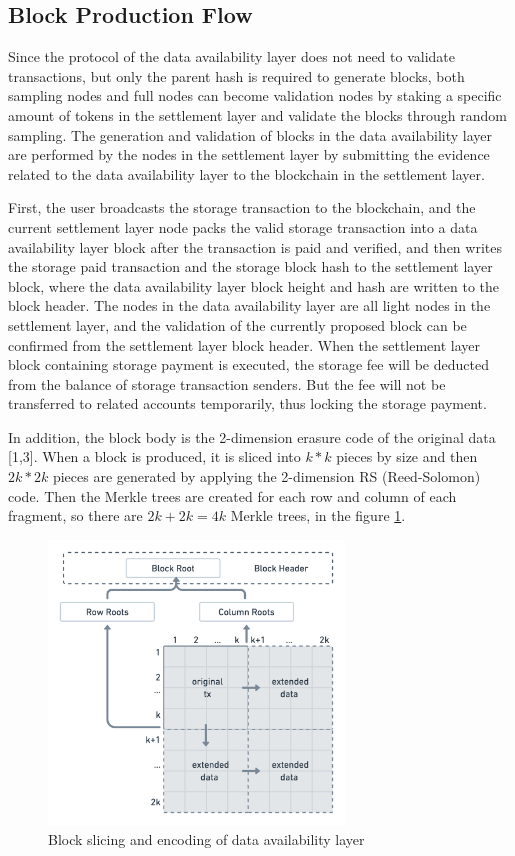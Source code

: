 \documentclass{iacrtrans}
\begin{document}
\subsection{Block Production Flow}
Since the protocol of the data availability layer does not need to validate transactions, but only the parent hash is required to generate blocks, both sampling nodes and full nodes can become validation nodes by staking a specific amount of tokens in the settlement layer and validate the blocks through random sampling. The generation and validation of blocks in the data availability layer are performed by the nodes in the settlement layer by submitting the evidence related to the data availability layer to the blockchain in the settlement layer.

First, the user broadcasts the storage transaction to the blockchain, and the current settlement layer node packs the valid storage transaction into a data availability layer block after the transaction is paid and verified, and then writes the storage paid transaction and the storage block hash to the settlement layer block, where the data availability layer block height and hash are written to the block header. The nodes in the data availability layer are all light nodes in the settlement layer, and the validation of the currently proposed block can be confirmed from the settlement layer block header. When the settlement layer block containing storage payment is executed, the storage fee will be deducted from the balance of storage transaction senders. But the fee will not be transferred to related accounts temporarily, thus locking the storage payment. 

In addition, the block body is the 2-dimension erasure code of the original data [1,3]. When a block is produced, it is sliced into $k * k$ pieces by size and then $2k * 2k$ pieces are generated by applying the 2-dimension RS (Reed-Solomon) code. Then the Merkle trees are created for each row and column of each fragment, so there are $2k + 2k = 4k$ Merkle trees, in the figure \ref{fig:8}.

\begin{figure}[h]
	\centering
	\includegraphics[width=0.7\textwidth]{images/8.png}
	\caption{Block slicing and encoding of data availability layer}
	\label{fig:8} 
\end{figure}
\end{document}
